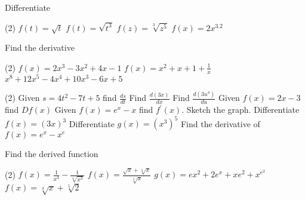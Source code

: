\begin{Exercise}[title={Rate of Change},label=exRateOfChange]
\begin{Exercise}[title={Standard Derivatives},label=exStandardDerivatives]
	\Question Differentiate
	\begin{tasks}(2)
		\task $f (t) =\sqrt{t}$ %
		\task $f (t) =\sqrt{t^{3}}$ %
		\task $f (z) =\sqrt[{3}]{z^{5}}$ %
		\task $f (x) =2 x^{3.2}$ %
	\end{tasks}
	
	\Question Find the derivative
\begin{tasks}(2)
	\task $f (x) =2 x^{3} -3 x^{2} +4 x -1$ %
	\task $f (x) =x^{2} +x +1 +\frac{1}{x}$ %
	\task $x^{8} +12 x^{5} -4 x^{4} +10 x^{3} -6 x +5$%
\end{tasks}

\Question 
\begin{tasks}(2)
	\task Given $s =4 t^{2} -7 t +5$ find $\frac{d s}{d t}$ %
	\task Find $\frac{d \left (3 x\right )}{d x}$  %
	\task Find $\frac{d \left (3 u^{4}\right )}{d u}$ %
	\task Given $f (x) =2 x -3$ find $D f (x)$ %
	\task Given $f (x) =e^{x} -x$ find $f^{ \prime } (x)$. Sketch the graph. %
	\task Differentiate $f (x) =\left (3 x\right )^{3}$ %
	\task Differentiate $g (x) =\left (x^{3}\right )^{5}$ %
	\task Find the derivative of $f (x) =e^{x} -x^{e}$ %
\end{tasks}

	\Question Find the derived function
\begin{tasks}(2)
	\task $f (x) =\frac{1}{x^{3}} -\frac{1}{\sqrt[{4}]{x^{3}}}$ %
	\task $f (x) =\frac{\sqrt{x} +\sqrt[{3}]{x}}{\sqrt[{4}]{x}}$ %
	\task $g (x) =e x^{2} +2 e^{x} +x e^{2} +x^{e^{2}}$ %
	\task $f (x) =\sqrt[{3}]{x} +\sqrt[{5}]{2}$ %
\end{tasks}


\end{Exercise}
\end{Exercise}
